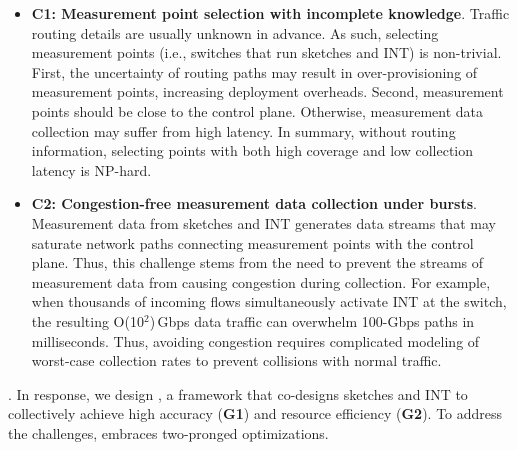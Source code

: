 \begin{itemize}[leftmargin=*]
%
    \item \textbf{C1: Measurement point selection with incomplete knowledge}. Traffic routing details are usually unknown in advance. As such, selecting measurement points (i.e., switches that run sketches and INT) is non-trivial. First, the uncertainty of routing paths may result in over-provisioning of measurement points, increasing deployment overheads. Second, measurement points should be close to the control plane. Otherwise, measurement data collection may suffer from high latency. In summary, without routing information, selecting points with both high coverage and low collection latency is NP-hard. 
%
%
    \item \textbf{C2: Congestion-free measurement data collection under bursts}. Measurement data from sketches and INT generates data streams that may saturate network paths connecting measurement points with the control plane. Thus, this challenge stems from the need to prevent the streams of measurement data from causing congestion during collection. For example, when thousands of incoming flows simultaneously activate INT at the switch, the resulting O(10$^2$)\,Gbps data traffic can overwhelm 100-Gbps paths in milliseconds. Thus, avoiding congestion requires complicated modeling of worst-case collection rates to prevent collisions with normal traffic. 
%
\end{itemize}

. In response, we design \sysname, a framework that co-designs sketches and INT to collectively achieve high accuracy (\textbf{G1}) and resource efficiency (\textbf{G2}). To address the challenges, \sysname embraces two-pronged optimizations. 

